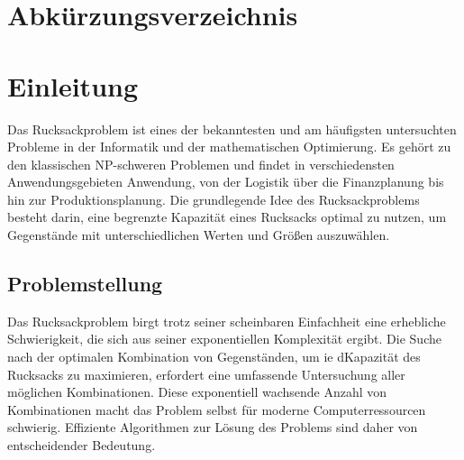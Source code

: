 \documentclass[12pt]{report}
\begin{document}
\listoftables


\newpage
\chapter*{Abkürzungsverzeichnis}

\begin{acronym}[SOAP]
\end{acronym}


\addtocounter{frontmatterPage}{\value{page}} 

\newpage
{}
\chapter{Einleitung}
Das Rucksackproblem ist eines der bekanntesten und am häufigsten untersuchten Probleme in der Informatik und der mathematischen Optimierung. Es gehört zu den klassischen NP-schweren Problemen und findet in verschiedensten Anwendungsgebieten Anwendung, von der Logistik über die Finanzplanung bis hin zur Produktionsplanung. Die grundlegende Idee des Rucksackproblems besteht darin, eine begrenzte Kapazität eines Rucksacks optimal zu nutzen, um Gegenstände mit unterschiedlichen Werten und Größen auszuwählen. 

\section{Problemstellung}
Das Rucksackproblem birgt trotz seiner scheinbaren Einfachheit eine erhebliche Schwierigkeit, die sich aus seiner exponentiellen Komplexität ergibt. Die Suche nach der optimalen Kombination von Gegenständen, um ie dKapazität des Rucksacks zu maximieren, erfordert eine umfassende Untersuchung aller möglichen Kombinationen. Diese exponentiell wachsende Anzahl von Kombinationen macht das Problem selbst für moderne Computerressourcen schwierig. Effiziente Algorithmen zur Lösung des Problems sind daher von entscheidender Bedeutung.
\end{document}

